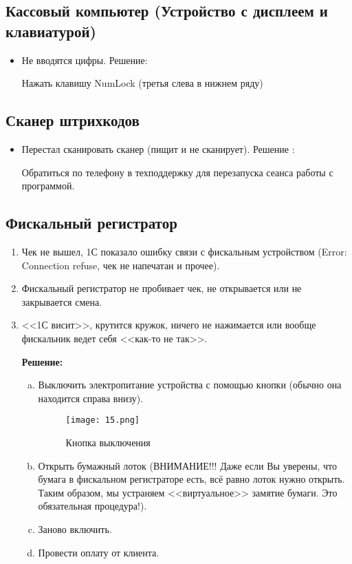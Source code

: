 \subsection{Кассовый компьютер (Устройство с дисплеем и клавиатурой)}

\begin{itemize}	
	\item Не вводятся цифры.
	Решение:
	\begin{myquote}
		Нажать клавишу NumLock (третья слева в нижнем ряду)
	\end{myquote}
\end{itemize}	
\subsection{Сканер штрихкодов}	
	\begin{itemize}	
		\item Перестал сканировать сканер (пищит и не сканирует).
		Решение :
		\begin{myquote}
			Обратиться по телефону в техподдержку для перезапуска сеанса работы с программой.
		\end{myquote}
\end{itemize}	    

\subsection{Фискальный регистратор}	
\begin{enumerate}	
	\item Чек не вышел, 1С показало ошибку связи с фискальным устройством (Error: Connection refuse, чек не напечатан и прочее).
	\item Фискальный регистратор не пробивает чек, не открывается или не закрывается смена.
	\item <<1С висит>>, крутится кружок, ничего не нажимается или вообще фискальник ведет себя <<как-то не так>>.
	\par
	\textbf{Решение:}
	\begin{myquote}
		\begin{enumerate}[a.]	
			\item Выключить электропитание устройства с помощью кнопки (обычно она находится справа внизу).
			\begin{figure}[H]
				\texttt{[image: 15.png]}
				\caption{Кнопка выключения}
				\label{ris:15.png}
			\end{figure}	
			\item Открыть бумажный лоток (ВНИМАНИЕ!!! Даже если Вы уверены, что бумага в фискальном регистраторе есть, всё равно лоток нужно открыть. Таким образом, мы устраняем <<виртуальное>>  замятие бумаги. Это обязательная процедура!).	
			\item Заново включить.					
			\item Провести оплату от клиента.
		\end{enumerate}	    	
	\end{myquote}
\end{enumerate}	    